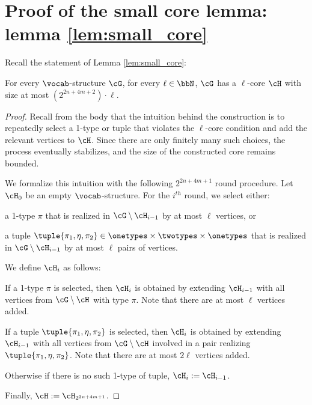 \section*{Proof of the small core lemma: lemma \ref{lem:small_core}}
Recall the statement of Lemma \ref{lem:small_core}:

\medskip

    For every $\vocab$-structure $\cG$, for every $\ell \in \bbN$,
    $\cG$ has a $\ell$-core $\cH$ with size at most $(2^{2n+4m+2}) \cdot \ell$.

\medskip


\begin{proof}
    Recall from the body that the intuition behind the construction is to repeatedly select a 1-type or tuple that violates the $\ell$-core condition
    and add the relevant vertices to $\cH$.
    Since there are only finitely many such choices, the process eventually stabilizes,
    and the size of the constructed core remains bounded.

    We formalize this intuition with the following $2^{2n+4m+1}$ round procedure.
    Let $\cH_0$ be an empty $\vocab$-structure.
    For the $i^{th}$ round,
    we select either:
    \begin{compactitem}
        \item
            a 1-type $\pi$ that is realized in $\cG \setminus \cH_{i-1}$ by at most $\ell$ vertices, or

        \item
            a tuple $\tuple{\pi_1, \eta, \pi_2} \in \onetypes \times \twotypes \times \onetypes$ that is realized in $\cG \setminus \cH_{i-1}$ by at most $\ell$ pairs of vertices.
    \end{compactitem}
    We define $\cH_{i}$ as follows:
    \begin{compactitem}
        \item
           If a 1-type $\pi$ is selected, then $\cH_i$ is obtained by extending $\cH_{i-1}$
           with all vertices from $\cG \setminus \cH$ with type $\pi$. 
            Note that there are at most $\ell$ vertices added.
        \item
            If a tuple $\tuple{\pi_1, \eta, \pi_2}$ is selected,
            then $\cH_i$ is obtained by extending  $\cH_{i-1}$ with all vertices from $\cG \setminus \cH$ involved in a pair realizing $\tuple{\pi_1, \eta, \pi_2}$.
            Note that there are at most $2\ell$ vertices added.
        \item Otherwise if there is no such 1-type of tuple, $\cH_i := \cH_{i-1}$.
    \end{compactitem}
    Finally, $\cH := \cH_{2^{2n+4m+1}}$.


\end{proof}
